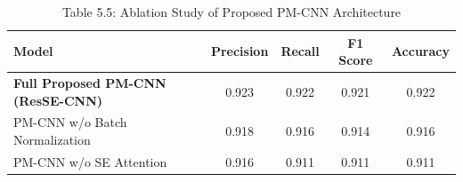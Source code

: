 \begin{table}[htbp]
\centering
\caption{Table 5.5: Ablation Study of Proposed PM-CNN Architecture}
\label{tab:ablation_perf}
\begin{tabular}{lcccc}
\toprule
\textbf{Model} & \textbf{Precision} & \textbf{Recall} & \textbf{F1 Score} & \textbf{Accuracy} \\
\midrule
\textbf{Full Proposed PM-CNN (ResSE-CNN)} &   0.923    &   0.922    &   0.921    &   0.922    \\
PM-CNN w/o Batch Normalization &   0.918    &   0.916    &   0.914    &   0.916    \\
PM-CNN w/o SE Attention        &   0.916    &   0.911    &   0.911    &   0.911    \\
\bottomrule
\end{tabular}
\end{table}
